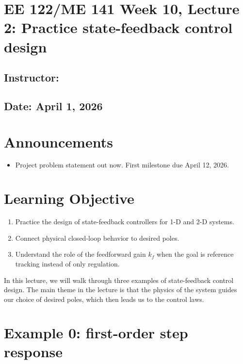 \documentclass{ee122_notes}
\renewcommand{\releasedate}{April 1, 2026}
\begin{document}
\section*{EE 122/ME 141 Week 10, Lecture 2: Practice state-feedback control design}
\subsection*{Instructor: \instructor}
\subsection*{Date: \releasedate}
\section{Announcements}
\begin{itemize}
    \item Project problem statement out now. First milestone due April 12, 2026.
\end{itemize}
\section{Learning Objective}
\begin{enumerate}
    \item Practice the design of state-feedback controllers for 1-D and 2-D systems.
    \item Connect physical closed-loop behavior to desired poles.
    \item Understand the role of the feedforward gain \(k_f\) when the goal is reference tracking instead of only regulation.
\end{enumerate}

In this lecture, we will walk through three examples of state-feedback control design. The main theme in the lecture is that the physics of the system guides our choice of desired poles, which then leads us to the control laws. 

\section{Example 0: first-order step response}
\end{document}
